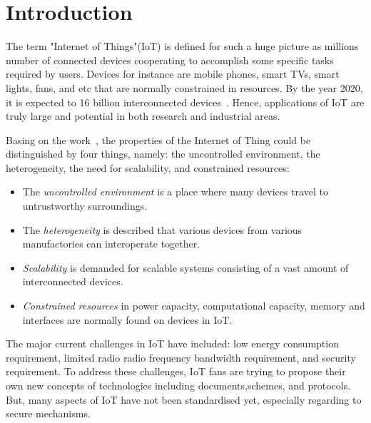 \chapter{Introduction} %

\label{Chapter1} %


The term "Internet of Things"(IoT) is defined for such a huge picture as millions number of connected devices cooperating to accomplish some specific tasks required by users. Devices for instance are mobile phones, smart TVs, smart lights, fans, and etc that are normally constrained in resources. By the year 2020, it is expected to 16 billion interconnected devices~\cite{iotsurvey}. Hence, applications of IoT are truly large and potential in both research and industrial areas. 

Basing on the work~\cite{TUD-CS-2015198}, the properties of the Internet of Thing could be distinguished by four things, namely: the uncontrolled environment, the heterogeneity, the need for scalability, and constrained resources:
\begin{itemize}
\item The \emph{uncontrolled environment} is a place where many devices travel to untrustworthy surroundings. 
\item The \emph{heterogeneity} is described that various devices from various manufactories can interoperate together. 
\item \emph{Scalability} is demanded for scalable systems consisting of a vast amount of interconnected devices. 
\item \emph{Constrained resources} in power capacity, computational capacity, memory and interfaces are normally found on devices in IoT. 
\end{itemize}

The major current challenges in IoT have included: low energy consumption requirement, limited radio radio frequency bandwidth requirement, and security requirement. To address these challenges, IoT fans are trying to propose their own new concepts of technologies including documents,schemes, and protocols. But, many aspects of IoT have not been standardised yet, especially regarding to secure mechanisms. 

